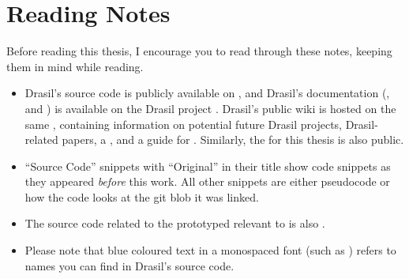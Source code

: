 \chapter{Reading Notes}
\label{chap:reading_notes}

Before reading this thesis, I encourage you to read through these notes, keeping
them in mind while reading.

\begin{itemize}

      \item Drasil's source code is publicly available on
            , and
            Drasil's documentation
            (,
            and
            )
            is available on the Drasil project
            .
            Drasil's public wiki is hosted on the same ,
            containing information on potential future Drasil projects,
            Drasil-related papers, a ,
            and a guide for .
            Similarly, the 
            for this thesis is also public.

      \item ``Source Code'' snippets with ``Original'' in their title show code
            snippets as they appeared \textit{before} this work. All other
            snippets are either pseudocode or how the code looks at the git blob
            it was linked.

      \item The source code related to the prototyped \ChunkDB{} relevant to
             is also .

      \item Please note that blue coloured text in a monospaced font (such as
            \ExampleText{}) refers to names you can find in Drasil's source
            code.


\end{itemize}
